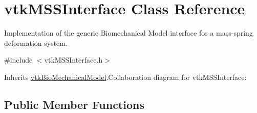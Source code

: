 \hypertarget{classvtkMSSInterface}{
\section{vtkMSSInterface Class Reference}
\label{classvtkMSSInterface}
}


Implementation of the generic Biomechanical Model interface for a mass-\/spring deformation system.  


{\ttfamily \#include $<$vtkMSSInterface.h$>$}

Inherits \hyperlink{classvtkBioMechanicalModel}{vtkBioMechanicalModel}.Collaboration diagram for vtkMSSInterface:\subsection*{Public Member Functions}
